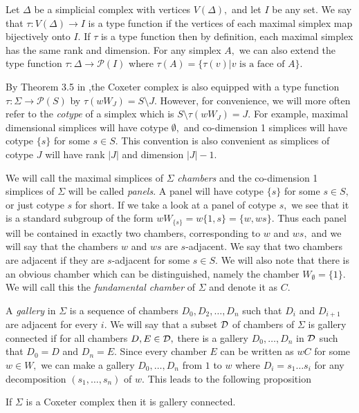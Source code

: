 \documentclass[class=book, crop=false,12 pt]{standalone}
\begin{document}
Let $\Delta$ be a simplicial complex with vertices $V(\Delta),$ and let $I$ be any set. We say that $\tau:V(\Delta)\to I$ is a type function if the vertices of each maximal simplex map bijectively onto $I.$ If $\tau$ is a type function then by definition, each maximal simplex has the same rank and dimension. For any simplex $A,$ we can also extend the type function $\tau:\Delta \to \mathcal{P}(I)$ where $\tau(A)=\{\tau(v)|v\text{ is a face of }A\}.$ 

By Theorem 3.5 in \cite{buildings},the Coxeter complex is also equipped with a type function $\tau:\Sigma \to \mathcal{P}(S)$ by $\tau(wW_J)=S\setminus J.$ However, for convenience, we will more often refer to the \emph{cotype} of a simplex which is $S\setminus \tau(wW_J)=J.$ For example, maximal dimensional simplices will have cotype $\emptyset,$ and co-dimension 1 simplices will have cotype $\{s\}$ for some $s\in S.$ This convention is also convenient as simplices of cotype $J$ will have rank $|J|$ and dimension $|J|-1.$

We will call the maximal simplices of $\Sigma$ \emph{chambers} and the co-dimension 1 simplices of $\Sigma$ will be called \emph{panels}. A panel will have cotype $\{s\}$ for some $s\in S,$ or just cotype $s$ for short. If we take a look at a panel of cotype $s,$ we see that it is a standard subgroup of the form $wW_{\{s\}}=w\{1,s\}=\{w,ws\}.$ Thus each panel will be contained in exactly two chambers, corresponding to $w$ and $ws,$ and we will say that the chambers $w$ and $ws$ are $s$-adjacent. We say that two chambers are adjacent if they are $s$-adjacent for some $s\in S.$ We will also note that there is an obvious chamber which can be distinguished, namely the chamber $W_\emptyset=\{1\}.$ We will call this the \emph{fundamental chamber} of $\Sigma$ and denote it as $C.$

A \emph{gallery} in $\Sigma$ is a sequence of chambers $D_0,D_2,\dots,D_n$ such that $D_i$ and $D_{i+1}$ are adjacent for every $i.$ We will say that a subset $\mathcal{D}$ of chambers of $\Sigma$ is gallery connected if for all chambers $D,E\in \mathcal{D},$ there is a gallery $D_0,\dots,D_n$ in $\mathcal{D}$ such that $D_0=D$ and $D_n=E.$ Since every chamber $E$ can be written as $wC$ for some $w\in W,$ we can make a gallery $D_0,\dots,D_n$ from $1$ to $w$ where $D_i=s_1\dots s_i$ for any decomposition $(s_1,\dots,s_n)$ of $w.$ This leads to the following proposition
\begin{prop}
	\label{prop:gallerycon}
	If $\Sigma$ is a Coxeter complex then it is gallery connected.
\end{prop}
\end{document}
